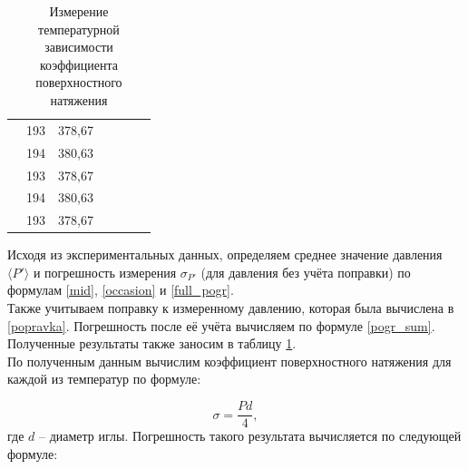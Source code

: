 \documentclass[a4paper, 12pt]{article}
\begin{document}
\begin{table}[H]
\begin{tabular}{ccccccc}
                \multicolumn{1}{|c|}{} & \multicolumn{1}{c|}{193} & \multicolumn{1}{c|}{378,67} & \multicolumn{1}{c|}{} & \multicolumn{1}{c|}{} & \multicolumn{1}{c|}{} & \multicolumn{1}{c|}{} \\ \cline{2-3}
                \multicolumn{1}{|c|}{} & \multicolumn{1}{c|}{194} & \multicolumn{1}{c|}{380,63} & \multicolumn{1}{c|}{} & \multicolumn{1}{c|}{} & \multicolumn{1}{c|}{} & \multicolumn{1}{c|}{} \\ \cline{2-3}
                \multicolumn{1}{|c|}{} & \multicolumn{1}{c|}{193} & \multicolumn{1}{c|}{378,67} & \multicolumn{1}{c|}{} & \multicolumn{1}{c|}{} & \multicolumn{1}{c|}{} & \multicolumn{1}{c|}{} \\ \cline{2-3}
                \multicolumn{1}{|c|}{} & \multicolumn{1}{c|}{194} & \multicolumn{1}{c|}{380,63} & \multicolumn{1}{c|}{} & \multicolumn{1}{c|}{} & \multicolumn{1}{c|}{} & \multicolumn{1}{c|}{} \\ \cline{2-3}
                \multicolumn{1}{|c|}{} & \multicolumn{1}{c|}{193} & \multicolumn{1}{c|}{378,67} & \multicolumn{1}{c|}{} & \multicolumn{1}{c|}{} & \multicolumn{1}{c|}{} & \multicolumn{1}{c|}{} \\ \hline
    	\end{tabular}
    	\caption{Измерение температурной зависимости коэффициента поверхностного натяжения}
    	\label{tab:pov}
    \end{table}

    \noindent Исходя из экспериментальных данных, определяем среднее значение давления $\langle P' \rangle$ и погрешность измерения $\sigma_{P'}$ (для давления без учёта поправки) по формулам \eqref{mid}, \eqref{occasion} и \eqref{full_pogr}.\\

    \noindent Также учитываем поправку к измеренному давлению, которая была вычислена в \ref{popravka}. Погрешность после её учёта вычисляем по формуле \eqref{pogr_sum}. Полученные результаты также заносим в таблицу \ref{tab:pov}.\\

    \noindent По полученным данным вычислим коэффициент поверхностного натяжения для каждой из температур по формуле:

    \begin{equation}
        \label{sigma}
        \sigma = \frac{Pd}{4},
    \end{equation}
    \noindent где $d$ -- диаметр иглы. Погрешность такого результата вычисляется по следующей формуле:
\end{document}
